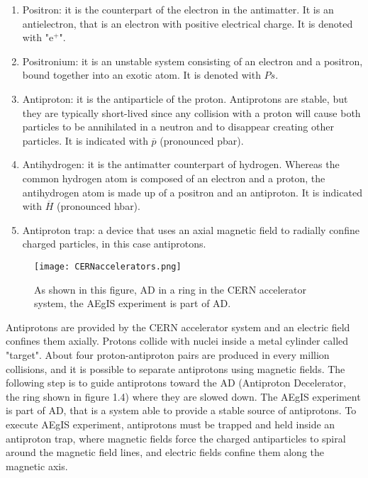 \begin{enumerate}

\item Positron: it is the counterpart of the electron in the antimatter. It is an antielectron, that is an electron with positive electrical charge. It is denoted with "e$^{+}$".

\item Positronium: it is an unstable system consisting of an electron and a positron, bound together into an exotic atom. It is denoted with $ {Ps} $.

\item Antiproton: it is the antiparticle of the proton. Antiprotons are stable, but they are typically short-lived since any collision with a proton will cause both particles to be annihilated in a neutron and to disappear creating other particles. It is indicated with $ \overline{p} $ (pronounced pbar).

\item Antihydrogen: it is the antimatter counterpart of hydrogen. Whereas the common hydrogen atom is composed of an electron and a proton, the antihydrogen atom is made up of a positron and an antiproton. It is indicated with $ \overline{H} $ (pronounced hbar).


\item Antiproton trap: a device that uses an axial magnetic field to radially confine charged particles, in this case antiprotons.


\end{enumerate}

\begin{figure}[H]
\centering
\texttt{[image: CERNaccelerators.png]} 
\caption{ As shown in this figure, AD in a ring in the CERN accelerator system, the AEgIS experiment is part of AD. }
\end{figure}


Antiprotons are provided by the CERN accelerator system and an electric field confines them axially. 
Protons collide with nuclei inside a metal cylinder called "target". About four proton-antiproton pairs are produced in every million collisions, and it is possible to separate antiprotons using magnetic fields. The following step is to guide antiprotons toward the AD (Antiproton Decelerator, the ring shown in figure 1.4) where they are slowed down. 
The AEgIS experiment is part of AD, that is a system able to provide a stable source of antiprotons.
To execute AEgIS experiment, antiprotons must be trapped and held inside an antiproton trap, where magnetic fields force the charged antiparticles to spiral around the magnetic field lines, and electric fields confine them along the magnetic axis.

